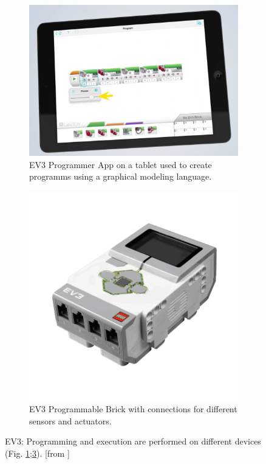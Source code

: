 \documentclass[runningheads,a4paper]{llncs}
\begin{document}
\begin{figure}[H]
	  \centering
	  \begin{subfigure}[t]{0.45\textwidth}\centering\includegraphics[width=.9\columnwidth]{images/mindstorms0.PNG}
	  \caption{EV3 Programmer App on a tablet used to create programms using a graphical modeling language. }\label{fig:ev3app}\end{subfigure}\hspace*{\fill}
	  \begin{subfigure}[t]{0.45\textwidth}\centering\includegraphics[width=.9\columnwidth]{images/ev3brick.png}
	  \caption{EV3 Programmable Brick with connections for different sensors and actuators. }  \label{fig:ev3pbrick}\end{subfigure}
	  \caption{EV3: Programming and execution are performed on different devices (Fig. \ref{fig:ev3app};\ref{fig:ev3pbrick}). [from \cite{legoev3}]}
\end{figure}
\end{document}
